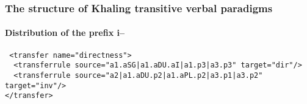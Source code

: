 \iffalse
\begin{frame} 
 \frametitle{The structure of  Khaling transitive verbal paradigms} 
\framesubtitle{Distribution of the prefix {{\textglotstop}i--}}

{\scriptsize{\tt
<transfer name="directness">\\
~~<transferrule source="a1.aSG|a1.aDU.aI|a1.p3|a3.p3" target="dir"/>\\
~~<transferrule source="a2|a1.aDU.p2|a1.aPL.p2|a3.p1|a3.p2" target="inv"/>\\
</transfer>
}}

\begin{table}[H]
\end{table}
\end{frame}
